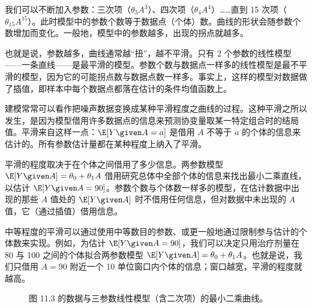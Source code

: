 
我们可以不断加入参数：三次项（$\theta_3A^3$）、四次项（$\theta_4A^4$）……直到 15 次项（$\theta_{15}A^{15}$）。此时模型中的参数个数等于数据点（个体）数。曲线的形状会随参数个数增加而变化。一般地，模型中的参数越多，出现的拐点就越多。

也就是说，参数越多，曲线通常越“扭”，越不平滑。只有 2 个参数的线性模型——一条直线——是最平滑的模型。参数个数与数据点一样多的线性模型是最不平滑的模型，因为它的可能拐点数与数据点数一样多。事实上，这样的模型对数据做了插值，即样本中每个数据点都落在估计的条件均值函数上。

建模常常可以看作把噪声数据变换成某种平滑程度之曲线的过程。这种平滑之所以发生，是因为模型借用许多数据点的信息来预测协变量取某一特定组合时的结局值。平滑来自这样一点：$\E[Y\given A=a]$ 是借用 $A$ 不等于 $a$ 的个体的信息来估计的。所有参数估计量都在某种程度上纳入了平滑。

平滑的程度取决于在个体之间借用了多少信息。两参数模型 $\E[Y\given A]=\theta_0+\theta_1 A$ 借用研究总体中全部个体的信息来找出最小二乘直线，以估计 $\E[Y\given A=90]$。参数个数与个体数一样多的模型，在估计数据中出现的那些 $A$ 值处的 $\E[Y\given A]$ 时不借用任何信息，但对数据中未出现的 $A$ 值，它（通过插值）借用信息。

中等程度的平滑可以通过使用中等数目的参数、或更一般地通过限制参与估计的个体数来实现。例如，为估计 $\E[Y\given A=90]$，我们可以决定只用治疗剂量在 80 与 100 之间的个体拟合两参数模型 $\E[Y\given A]=\theta_0+\theta_1 A$。也就是说，我们只借用 $A=90$ 附近一个 10 单位窗口内个体的信息；窗口越宽，平滑的程度就越高。

\begin{figure}[htbp]
\centering
{}
\caption{图 11.3 的数据与三参数线性模型（含二次项）的最小二乘曲线。}
\label{fig:11.5}
\end{figure}

